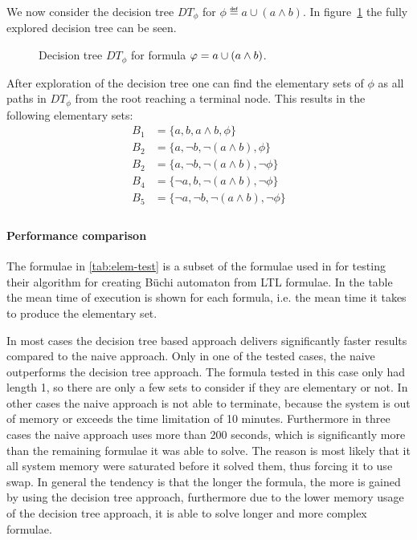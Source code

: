 \begin{example}
We now consider the decision tree $DT_\phi$ for $\phi \eqdef a \cup (a \land b)$. In figure~\ref{fig:elemset} the fully explored decision tree can be seen.

\begin{figure}[!ht]
\begin{center}
    
    \caption{Decision tree $DT_\phi$ for formula $\varphi = a \cup (a \land b)$.}
    \label{fig:elemset}
\end{center}
\end{figure}

After exploration of the decision tree one can find the elementary sets of $\phi$ as all paths in $DT_\phi$ from the root reaching a terminal node. This results in the following elementary sets:
\begin{align*}
    B_1 &= \{a,         b,         a\land b,           \phi\} \\
    B_2 &= \{a,         \lnot b,    \lnot (a\land b),   \phi\} \\
    B_2 &= \{a,         \lnot b,    \lnot (a\land b),   \lnot \phi\} \\
    B_4 &= \{\lnot a,   b,         \lnot (a\land b),  \lnot \phi\} \\
    B_5 &= \{\lnot a,   \lnot b,    \lnot (a\land b),   \lnot \phi\} \\
\end{align*}
\end{example}

\paragraph{Performance comparison}
The formulae in \autoref{tab:elem-test} is a subset of the formulae used in \cite[Tab.~1]{somenzi2000efficient} for testing their algorithm for creating Büchi automaton from LTL formulae. In the table the mean time of execution is shown for each formula, i.e. the mean time it takes to produce the elementary set.



In most cases the decision tree based approach delivers significantly faster results compared to the naive approach. Only in one of the tested cases, the naive outperforms the decision tree approach. The formula tested in this case only had length 1, so there are only a few sets to consider if they are elementary or not. In other cases the naive approach is not able to terminate, because the system is out of memory or exceeds the time limitation of 10 minutes. Furthermore in three cases the naive approach uses more than 200 seconds, which is significantly more than the remaining formulae it was able to solve. The reason is most likely that it all system memory were saturated before it solved them, thus forcing it to use swap. In general the tendency is that the longer the formula, the more is gained by using the decision tree approach, furthermore due to the lower memory usage of the decision tree approach, it is able to solve longer and more complex formulae.

